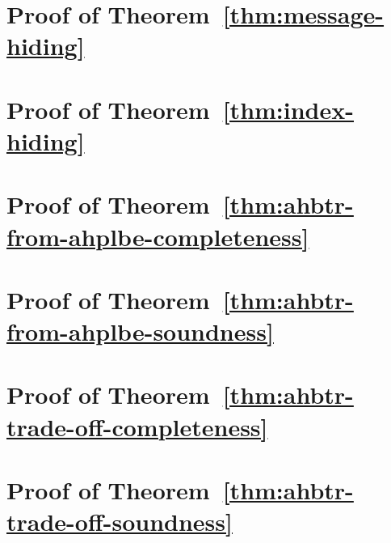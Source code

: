 \section{Proof of Theorem~\ref{thm:message-hiding}}



\section{Proof of Theorem~\ref{thm:index-hiding}}



\section{Proof of Theorem~\ref{thm:ahbtr-from-ahplbe-completeness}}



\section{Proof of Theorem~\ref{thm:ahbtr-from-ahplbe-soundness}}



\section{Proof of Theorem~\ref{thm:ahbtr-trade-off-completeness}}



\section{Proof of Theorem~\ref{thm:ahbtr-trade-off-soundness}}


